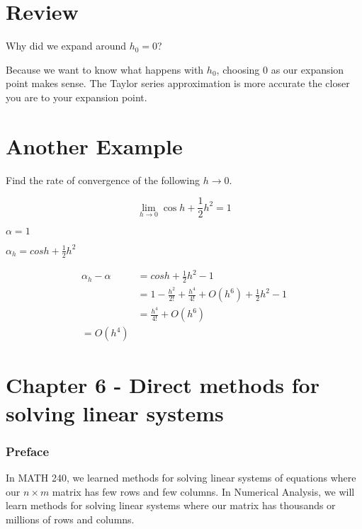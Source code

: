 \renewcommand{\arraystretch}{1.25} %
\setlength{\arraycolsep}{12pt} 

\section{Review}

Why did we expand around $h_0 = 0$?

\quad Because we want to know what happens with $h_0$, choosing $0$ as our 
expansion point makes sense. The Taylor series approximation is more accurate 
the closer you are to your expansion point.


\section{Another Example}

Find the rate of convergence of the following $h\to 0$.

\begin{equation*}
  \lim_{h \to 0} \cos h + \frac{1}{2} h^2 = 1
\end{equation*}

$\alpha = 1$

$\alpha_h = cos h + \frac{1}{2} h^2$

\begin{align*}
  \alpha_h - \alpha &= cos h + \frac{1}{2} h^2 - 1\\
  &= 1-\frac{h^2}{2!}+\frac{h^4}{4!} + O(h^6) + \frac{1}{2}h^2 - 1 \\
  &= \frac{h^4}{4!} + O(h^6) \\
  = O(h^4)
\end{align*}

\section{Chapter 6 - Direct methods for solving linear systems}

\subsubsection*{Preface}

In MATH 240, we learned methods for solving linear systems of equations where
our $n \times m$ matrix has few rows and few columns. In Numerical Analysis, we
will learn methods for solving linear systems where our matrix has thousands or
millions of rows and columns.

